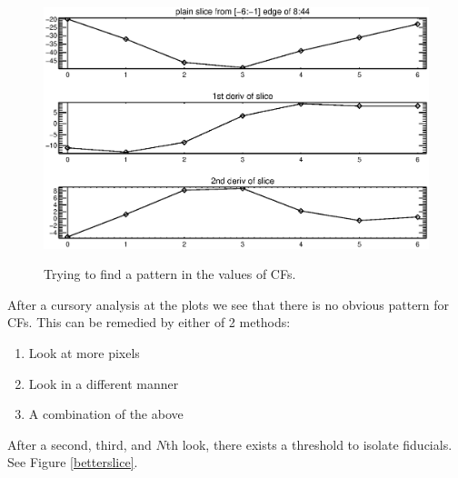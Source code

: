 \documentclass[10pt]{article}
\begin{document}
\begin{figure}[!ht]
{        \includegraphics[width=0.5\linewidth, height = .34\textheight, keepaspectratio=true]{plots_tables_images/slice6.eps}
        }
        \caption{Trying to find a pattern in the values of CFs.}
        \label{6slices}
\end{figure}

After a cursory analysis at the plots we see that there is no obvious pattern for CFs. This can be remedied by either of 2 methods:

\begin{enumerate}
    \item Look at more pixels
    \item Look in a different manner
    \item A combination of the above
\end{enumerate}

After a second, third, and $N$th look, there exists a threshold to isolate fiducials. See Figure \ref{betterslice}.\\
\end{document}
